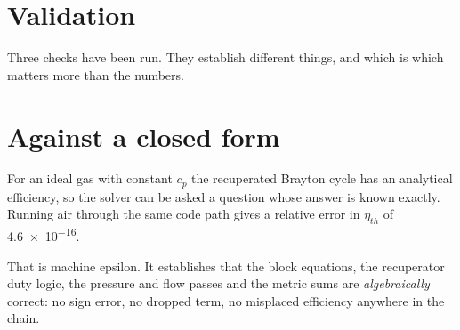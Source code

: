 \documentclass[11pt,a4paper]{report}
\begin{document}
\begingroup
  \let\oldsection\section
  \let\oldsubsection\subsection
  \let\oldsubsubsection\subsubsection
  \let\section\chapter
  \let\subsection\oldsection
  \let\subsubsection\oldsubsection
  \let\appendix\relax
  
\endgroup

\appendix

\chapter{Validation}
\label{app:validation}

Three checks have been run. They establish different things, and which is
which matters more than the numbers.

\section{Against a closed form}

For an ideal gas with constant $c_p$ the recuperated Brayton cycle has an
analytical efficiency, so the solver can be asked a question whose answer is
known exactly. Running air through the same code path gives a relative error
in $\eta_{th}$ of \num{4.6e-16}.

That is machine epsilon. It establishes that the block equations, the
recuperator duty logic, the pressure and flow passes and the metric sums are
\emph{algebraically} correct: no sign error, no dropped term, no misplaced
efficiency anywhere in the chain.
\end{document}
